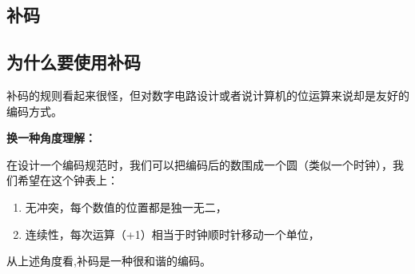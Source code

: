 \subsection{补码}

\subsection{为什么要使用补码}

补码的规则看起来很怪，但对数字电路设计或者说计算机的位运算来说却是友好的编码方式。

\textbf{换一种角度理解：}

在设计一个编码规范时，我们可以把编码后的数围成一个圆（类似一个时钟），我们希望在这个钟表上：
\begin{enumerate}
\item 
无冲突，每个数值的位置都是独一无二，
\item 
连续性，每次运算（+1）相当于时钟顺时针移动一个单位，
\end{enumerate}

从上述角度看,补码是一种很和谐的编码。







